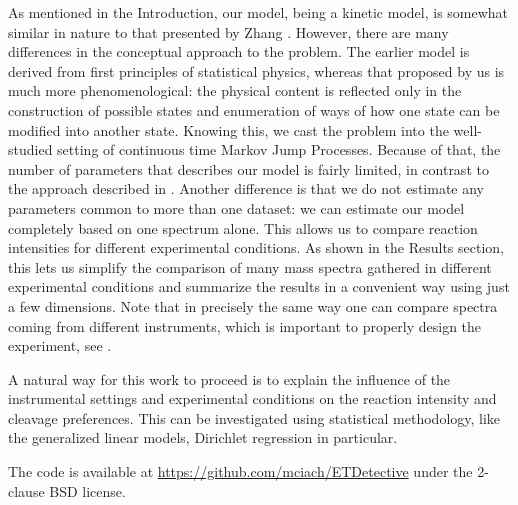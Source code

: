 \documentclass{llncs}
\begin{document}
As mentioned in the Introduction, our model, being a kinetic model, is somewhat similar in nature to that presented by Zhang \cite{Zhang2010-fp}. However, there are many differences in the conceptual approach to the problem. The earlier model is derived from first principles of statistical physics, whereas that proposed by us is much more phenomenological: the physical content is reflected only in the construction of possible states and enumeration of ways of how one state can be modified into another state. Knowing this, we cast the problem into the well-studied setting of continuous time Markov Jump Processes. Because of that, the number of parameters that describes our model is fairly limited, in contrast to the approach described in  \cite{Zhang2010-fp}. Another difference is that we do not estimate any parameters common to more than one dataset: we can estimate our model completely based on one spectrum alone. This allows us to compare reaction intensities for different experimental conditions. As shown in the Results section, this lets us simplify the comparison of many mass spectra gathered in different experimental conditions and summarize the results in a convenient way using just a few dimensions. Note that in precisely the same way one can compare spectra coming from different instruments, which is important to properly design the experiment, see \cite{Lermyte2015-lm}.

A natural way for this work to proceed is to explain the influence of the instrumental settings and experimental conditions on the reaction intensity and cleavage preferences. This can be investigated using statistical methodology, like the generalized linear models, Dirichlet regression in particular.

The code is available at \url{https://github.com/mciach/ETDetective} under the 2-clause BSD license.\\

\end{document}
